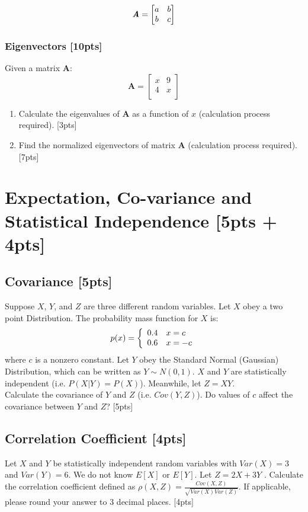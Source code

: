 \documentclass{article}
\begin{document}
$$\textbf{\textit{A}}=\begin{bmatrix}
    a & b \\
    b & c
\end{bmatrix}$$


\subsubsection{Eigenvectors [10pts]}
Given a matrix $\boldsymbol{A}$:
$$\boldsymbol{A} = \begin{bmatrix} 
    x & 9  \\ 
    4 & x \\
\end{bmatrix}$$
\begin{enumerate}[label=(\alph*)]
    \item Calculate the eigenvalues of $\boldsymbol{A}$ as a function of $x$ (calculation process required). [3pts]
    \item Find the normalized eigenvectors of matrix $\boldsymbol{A}$ (calculation process required). [7pts]
\end{enumerate}

\newpage
\section{Expectation, Co-variance and Statistical Independence [5pts + 4pts]}
\subsection{Covariance [5pts]}
Suppose $X$, $Y$, and $Z$ are three different random variables.
Let $X$ obey a two point Distribution. The probability mass function for $X$ is:
    $$p(x)=\left\{
    \begin{array}{ c l}	
        0.4 & x = c\\
        0.6 & x = -c
    \end{array}\right.$$
where $c$ is a nonzero constant. Let $Y$ obey the Standard Normal (Gaussian) Distribution, which can be written as $Y \sim N(0,1)$. $X$ and $Y$ are statistically independent (i.e. $P(X|Y) = P(X)$). Meanwhile, let $Z = XY$. \\

\noindent Calculate the covariance of $Y$ and $Z$ (i.e. $Cov(Y, Z)$). Do values of $c$ affect the covariance between $Y$ and $Z$? [5pts]

\newpage
\subsection{Correlation Coefficient [4pts]}
Let $X$ and $Y$ be statistically independent random variables with $Var(X) = 3$ and $Var(Y) = 6$. We do not know $E[X]$ or $E[Y]$. Let $Z = 2X + 3Y$ . Calculate the correlation coefficient defined as $\rho(X,Z)=\frac{Cov(X,Z)}{\sqrt{Var(X)Var(Z)}}$. If applicable, please round your answer to 3 decimal places. [4pts]
\end{document}
